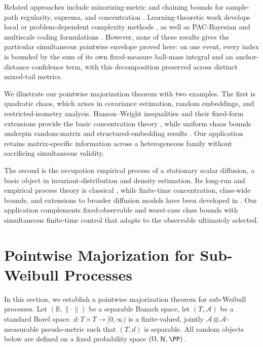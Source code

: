 \documentclass[11pt]{article}
\begin{document}
Related approaches include minorizing-metric and chaining bounds for
sample-path regularity, suprema, and concentration
\citep{kwapien2004sample,bednorz2007holder,
bednorz2006theorem,bednorz2014concentration}. Learning-theoretic work
develops local or problem-dependent complexity methods
\citep{10.1214/009053605000000282,koltchinskii2006local,xu2025towards}, as well as
PAC-Bayesian and multiscale coding formulations
\citep{audibert2007combining,maurer2010codes,chu2026codes}. However, none
of these results gives the particular simultaneous pointwise envelope
proved here: on one event, every index is bounded by the sum of its own
fixed-measure ball-mass integral and an anchor-distance confidence term,
with this decomposition preserved across distinct mixed-tail metrics.

We illustrate our pointwise majorization theorem with two examples.  The first is
quadratic chaos, which arises in covariance estimation, random embeddings,
and restricted-isometry analysis. Hanson–Wright inequalities and their
fixed-form extensions provide the basic concentration theory
\citep{hanson1971bound,10.1214/ECP.v18-2865,hsu2012tail,adamczak2015note},
while uniform chaos bounds underpin random-matrix and structured-embedding
results \citep{mendelson2008uniform,krahmer2014suprema,dirksen2015tail,
klochkov2020uniform}.  Our application retains matrix-specific information
across a heterogeneous family without sacrificing simultaneous validity.

The second is the occupation empirical process of a stationary scalar
diffusion, a basic object in invariant-distribution and density estimation. Its long-run and empirical process theory is classical
\citep{kipnis1986central,vanzanten2003empirical,vandervaart2005donsker},
while finite-time concentration, class-wide bounds, and extensions to
broader diffusion models have been developed in
\citet{cattiaux2008deviation,redig2011concentration,gao2014bernstein,
pepin2021concentration,aeckerle2021concentration,
trottner2023concentration}.  Our application complements fixed-observable
and worst-case class bounds with simultaneous finite-time control that
adapts to the observable ultimately selected.
\fi

\iffalse
\section{Pointwise Majorization for Sub-Weibull Processes}\label{sec:sub-weibull_majorization}
In this section, we establish a pointwise majorization theorem for
sub-Weibull processes. Let $(\mathbb B,\|\cdot\|)$ be a separable
Banach space, let $(T,\mathcal A)$ be a standard Borel space. $d:T\times T\longrightarrow[0,\infty)$
is a finite-valued, jointly
$\mathcal A\otimes\mathcal A$-measurable pseudo-metric such that
$(T,d)$ is separable. All random objects below are defined on a fixed
probability space $(\Omega,\mathcal H,\PP)$.
\end{document}
